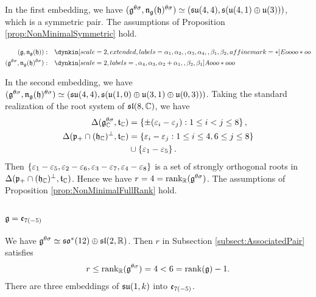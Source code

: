 In the first embedding, we have $(\mathfrak{g}^{\theta\sigma}, \mathfrak{n}_{\mathfrak{g}}(\mathfrak{h})^{\theta\sigma}) \simeq (\mathfrak{su}(4, 4), \mathfrak{s}(\mathfrak{u}(4, 1) \oplus \mathfrak{u}(3)))$, which is a symmetric pair.
The assumptions of Proposition \ref{prop:NonMinimalSymmetric} hold.


\begin{align*}
	(\lie{g}, \lieNorm_{\lie{g}}(\lie{h})): \quad & \dynkin[scale=2, extended, labels={\alpha_1, \alpha_2, , \alpha_3, \alpha_4, , \beta_1, \beta_2}, affine mark=*]{E}{oooo*oo} \\
	(\lie{g}^{\theta\sigma}, \lieNorm_{\lie{g}}(\lie{h})^{\theta\sigma}): \quad & \dynkin[scale=2, labels={, \alpha_4, \alpha_3, \alpha_2 + \alpha_1, , \beta_2, \beta_1}]{A}{ooo*ooo}
\end{align*}

In the second embedding, we have $(\mathfrak{g}^{\theta\sigma}, \mathfrak{n}_{\mathfrak{g}}(\mathfrak{h})^{\theta\sigma}) \simeq (\mathfrak{su}(4, 4), \mathfrak{s}(\mathfrak{u}(1, 0) \oplus \mathfrak{u}(3, 1) \oplus \mathfrak{u}(0, 3)))$.
Taking the standard realization of the root system of $\mathfrak{sl}(8, \mathbb{C})$, we have
\begin{align*}
	\Delta(\mathfrak{g}_{\mathbb{C}}^{\theta\sigma}, \mathfrak{t}_{\mathbb{C}}) &= \left\{\pm (\varepsilon_i - \varepsilon_j): 1\leq i < j \leq 8 \right\}, \\
	\Delta(\mathfrak{p}_+ \cap (\mathfrak{h}_{\mathbb{C}})^\perp, \mathfrak{t}_{\mathbb{C}}) &= \left\{\varepsilon_i - \varepsilon_j: 1\leq i \leq 4,  6\leq j \leq 8 \right\} \\
	&\cup \left\{\varepsilon_1 - \varepsilon_5 \right\}.
\end{align*}
Then $\left\{\varepsilon_1 - \varepsilon_5, \varepsilon_2 - \varepsilon_6, \varepsilon_3 - \varepsilon_7, \varepsilon_4 - \varepsilon_8 \right\}$ is a set of strongly orthogonal roots in $\Delta(\mathfrak{p}_+ \cap (\mathfrak{h}_{\mathbb{C}})^\perp, \mathfrak{t}_{\mathbb{C}})$.
Hence we have $r = 4 = \operatorname{rank}_{\mathbb{R}}(\mathfrak{g}^{\theta\sigma})$.
The assumptions of Proposition \ref{prop:NonMinimalFullRank} hold.

\subsubsection{\texorpdfstring{$\mathfrak{g} = \mathfrak{e}_{7(-5)}$}{g=e7(-5)}}


We have $\mathfrak{g}^{\theta\sigma} \simeq \mathfrak{so}^*(12) \oplus \mathfrak{sl}(2,\mathbb{R})$.
Then $r$ in Subsection \ref{subsect:AssociatedPair} satisfies
\begin{align*}
	r \leq \operatorname{rank}_{\mathbb{R}}(\mathfrak{g}^{\theta\sigma}) = 4 < 6 = \operatorname{rank}(\mathfrak{g}) - 1.
\end{align*}
There are three embeddings of $\mathfrak{su}(1, k)$ into $\mathfrak{e}_{7(-5)}$.

